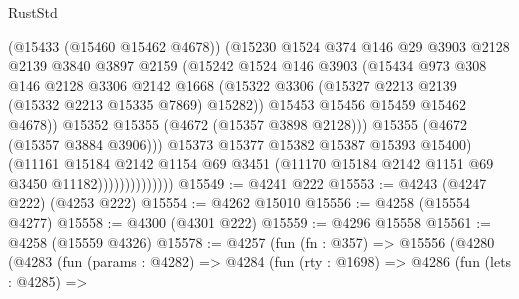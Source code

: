 \begin{lexlean}{RustStd}
\begin{coremodule}
{\begin{coremodule}
{{{{{{{{{{{{{{{{                                (@15433 (@15460 @15462 @4678))
                                (@15230
                                  @1524
                                  @374
                                  @146
                                  @29
                                  @3903
                                  @2128
                                  @2139
                                  @3840
                                  @3897
                                  @2159
                                  (@15242
                                    @1524
                                    @146
                                    @3903
                                    (@15434
                                      @973
                                      @308
                                      @146
                                      @2128
                                      @3306
                                      @2142
                                      @1668
                                      (@15322
                                        @3306
                                        (@15327 @2213 @2139 (@15332 @2213 @15335 @7869) @15282))
                                      @15453
                                      @15456
                                      @15459
                                      @15462
                                      @4678))
                                  @15352
                                  @15355
                                  (@4672 (@15357 @3898 @2128)))
                                @15355
                                (@4672 (@15357 @3884 @3906)))
                              @15373
                              @15377
                              @15382
                              @15387
                              @15393
                              @15400)
                            (@11161
                              @15184
                              @2142
                              @1154
                              @69
                              @3451
                              (@11170 @15184 @2142 @1151 @69 @3450 @11182))))))))))))))
@15549 := @4241 @222
@15553 := @4243 (@4247 @222) (@4253 @222)
@15554 := @4262 @15010
@15556 := @4258 (@15554 @4277)
@15558 := @4300 (@4301 @222)
@15559 := @4296 @15558
@15561 := @4258 (@15559 @4326)
@15578 := @4257
    (fun (fn : @357) =>
    @15556
      (@4280
        (@4283
          (fun (params : @4282) =>
          @4284
            (fun (rty : @1698) =>
            @4286
              (fun (lets : @4285) =>
}}}}}}}}}}}}}}}}
\end{coremodule}}
\end{coremodule}
\end{lexlean}
